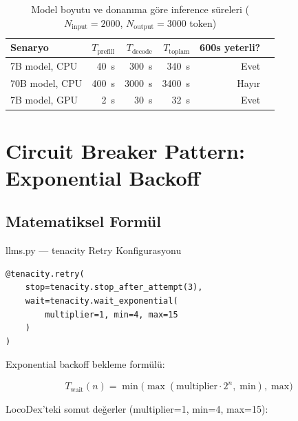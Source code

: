 \begin{table}[H]
\centering
\caption{Model boyutu ve donan{\i}ma g\"{o}re inference s\"{u}releri ($N_{\mathrm{input}}=2000$, $N_{\mathrm{output}}=3000$ token)}
\label{tab:inference-times}
\begin{tabularx}{\textwidth}{lrrrrr}
\toprule
\color{chapterBlue}\textbf{Senaryo} & \color{chapterBlue}\textbf{$T_{\mathrm{prefill}}$} & \color{chapterBlue}\textbf{$T_{\mathrm{decode}}$} & \color{chapterBlue}\textbf{$T_{\mathrm{toplam}}$} & \color{chapterBlue}\textbf{600s yeterli?} \\
\midrule
7B model, CPU  & 40~s  & 300~s   & 340~s  & Evet \\
70B model, CPU & 400~s & 3000~s  & 3400~s & \color{codeRed}Hay{\i}r \\
7B model, GPU  & 2~s   & 30~s    & 32~s   & Evet \\
\bottomrule
\end{tabularx}
\end{table}


\section{Circuit Breaker Pattern: Exponential Backoff}
\label{sec:circuit-breaker}

\subsection{Matematiksel Form\"{u}l}
\label{sec:exp-backoff}

\begin{kodref}{llms.py --- tenacity Retry Konfigurasyonu}
\begin{lstlisting}
@tenacity.retry(
    stop=tenacity.stop_after_attempt(3),
    wait=tenacity.wait_exponential(
        multiplier=1, min=4, max=15
    )
)
\end{lstlisting}
\end{kodref}

Exponential backoff bekleme form\"{u}l\"{u}:

\begin{equation}
\label{eq:exp-backoff}
T_{\mathrm{wait}}(n) = \min\!\bigl(\max(\text{multiplier} \cdot 2^n,\; \text{min}),\; \text{max}\bigr)
\end{equation}

LocoDex'teki somut de\u{g}erler (multiplier=1, min=4, max=15):

